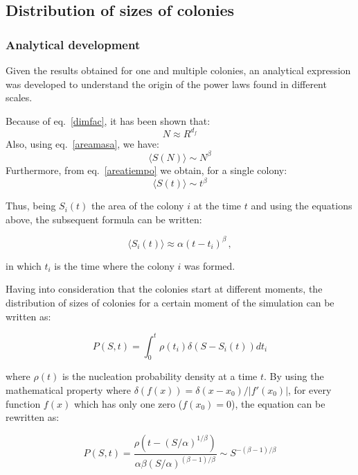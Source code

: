 \documentclass[aps,twocolumn,pre]{revtex4-2}
\begin{document}
\subsection{Distribution of sizes of colonies}

\subsubsection{Analytical development}
Given the results obtained for one and multiple colonies, an analytical expression was developed to understand the origin of the power laws found in different scales.



Because of eq.~\ref{dimfac}, it has been shown that:
\begin{equation*}
    N \approx R^ {d_f} 
\end{equation*}
Also, using eq.~\ref{areamasa}, we have:
\begin{equation*}
\langle S(N) \rangle \sim N^{\beta}
\end{equation*}
Furthermore, from eq.~\ref{areatiempo} we obtain, for a single colony:
\begin{equation*}
\langle S(t) \rangle \sim t^{\beta}
\end{equation*}


Thus, being $S_i(t)$ the area of the colony $i$ at the time $t$ and using the equations above, the subsequent formula can be written:

\begin{equation*}
\langle S_i(t) \rangle \approx \alpha (t-t_i)^\beta     \, ,
\end{equation*}

in which $t_i$ is the time where the colony $i$ was formed.

Having into consideration that the colonies start at different moments, the distribution of sizes of colonies for a certain moment of the simulation can be written as:

\begin{equation*}
    P(S,t) = \int_0^t \rho(t_i) \delta(S-S_i(t)) dt_i
\end{equation*}

where $\rho (t)$ is the nucleation probability density at a time $t$. By using the mathematical property where $\delta(f(x))=\delta(x-x_0)/|f'(x_0)|$, for every function $f(x)$ which has only one zero ($f(x_0)=0$), the equation can be rewritten as:

\begin{equation*}
    P(S,t) = \frac{\rho(t-(S/\alpha)^{1/\beta})}{\alpha \beta (S/\alpha)^{(\beta-1)/\beta}} \sim S^{-(\beta-1)/\beta}
\label{tamaniosclusters}
\end{equation*}
\end{document}
